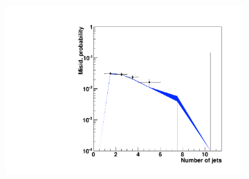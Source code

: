 \begin{figure}
\begin{subfigure}[b]{0.33\textwidth}
                \includegraphics[width=\textwidth]{4_Analisys/pics/8TeV/plots/fakerates/m_emt_kNN_numJets20.pdf}
                \caption{}
        \end{subfigure}


\end{figure}
